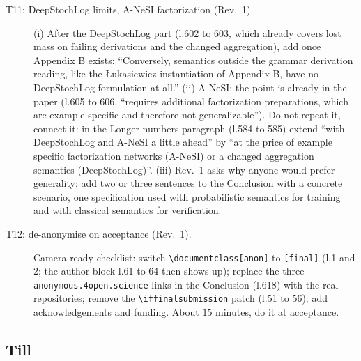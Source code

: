 \documentclass[anon]{../../journal-templates/NeSy26/nesy2026} %
\begin{document}
\begin{description}
\item[T11: DeepStochLog limits, A-NeSI factorization (Rev.~1).]
(i) After the DeepStochLog part (l.602 to 603, which already covers lost
mass on failing derivations and the changed aggregation), add once
Appendix B exists: ``Conversely, semantics outside the grammar derivation
reading, like the {\L}ukasiewicz instantiation of Appendix B, have no
DeepStochLog formulation at all.'' (ii) A-NeSI: the point is already in the
paper (l.605 to 606, ``requires additional factorization preparations,
which are example specific and therefore not generalizable''). Do not
repeat it, connect it: in the Longer numbers paragraph (l.584 to 585)
extend ``with DeepStochLog and A-NeSI a little ahead'' by ``at the price of
example specific factorization networks (A-NeSI) or a changed aggregation
semantics (DeepStochLog)''. (iii) Rev.~1 asks why anyone would prefer
generality: add two or three sentences to the Conclusion with a concrete
scenario, one specification used with probabilistic semantics for training
and with classical semantics for verification.

\item[T12: de-anonymise on acceptance (Rev.~1).]
Camera ready checklist: switch \verb|\documentclass[anon]| to
\verb|[final]| (l.1 and 2; the author block l.61 to 64 then shows up);
replace the three \texttt{anonymous.4open.science} links in the Conclusion
(l.618) with the real repositories; remove the \verb|\iffinalsubmission|
patch (l.51 to 56); add acknowledgements and funding. About $15$ minutes,
do it at acceptance.

\end{description}

\subsection*{Till}
\end{document}

